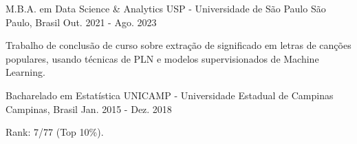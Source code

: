 \begin{cventries}
  \cventry
    {M.B.A. em Data Science \& Analytics}
    {USP - Universidade de São Paulo}
    {São Paulo, Brasil}
    {Out. 2021 - Ago. 2023}
    {
        \begin{cvitems}
          \item {Trabalho de conclusão de curso sobre extração de significado em letras de canções populares, usando técnicas de PLN e modelos supervisionados de Machine Learning. }
        \end{cvitems}
      }
\end{cventries}
\begin{cventries}
  \cventry
    {Bacharelado em Estatística}
    {UNICAMP - Universidade Estadual de Campinas}
    {Campinas, Brasil}
    {Jan. 2015 - Dez. 2018}
    {
        \begin{cvitems}
          \item {Rank: 7/77 (Top 10\%).}
        \end{cvitems}
      }
\end{cventries}


